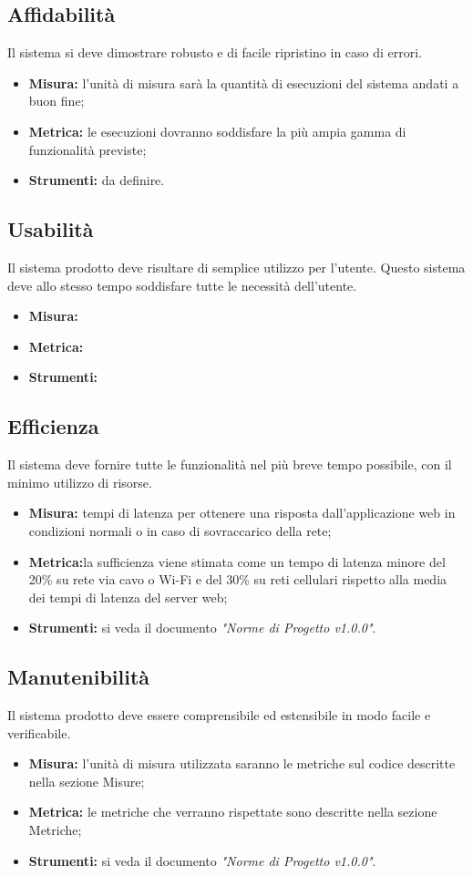 \documentclass[12pt,a4paper,titlepage]{article}
\begin{document}
		\subsection{Affidabilità}
		Il sistema si deve dimostrare robusto e di facile ripristino in caso di errori.
		\begin{itemize}
			\item \textbf{Misura:} l'unità di misura sarà la quantità di esecuzioni del sistema andati a buon fine;
			\item \textbf{Metrica:} le esecuzioni dovranno soddisfare la più ampia gamma di funzionalità previste;
			\item \textbf{Strumenti:} da definire.
		\end{itemize}
		\subsection{Usabilità}
		Il sistema prodotto deve risultare di semplice utilizzo per l'utente. Questo sistema deve allo stesso tempo soddisfare tutte le necessità dell'utente.
		\begin{itemize}
			\item \textbf{Misura:}
			\item \textbf{Metrica:}
			\item \textbf{Strumenti:}
		\end{itemize}
		\subsection{Efficienza}
		Il sistema deve fornire tutte le funzionalità nel più breve tempo possibile, con il minimo utilizzo di risorse.
		\begin{itemize}
			\item \textbf{Misura:} tempi di latenza per ottenere una risposta dall'applicazione web in condizioni normali o in caso di sovraccarico della rete;
			\item \textbf{Metrica:}la sufficienza viene stimata come un tempo di latenza minore del 20\% su rete via cavo o Wi-Fi e del 30\% su reti cellulari rispetto alla media dei tempi di latenza del server web;
			\item \textbf{Strumenti:} si veda il documento \textit{"Norme di Progetto v1.0.0"}.
		\end{itemize}
		\subsection{Manutenibilità}
		Il sistema prodotto deve essere comprensibile ed estensibile in modo facile e verificabile.
		\begin{itemize}
			\item \textbf{Misura:} l'unità di misura utilizzata saranno le metriche sul codice descritte nella sezione Misure;
			\item \textbf{Metrica:} le metriche che verranno rispettate sono descritte nella sezione Metriche;
			\item \textbf{Strumenti:} si veda il documento \textit{"Norme di Progetto v1.0.0"}.
		\end{itemize}
\end{document}
